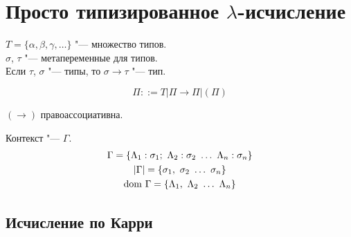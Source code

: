 \section{Просто типизированное $\lambda$-исчисление}

\begin{definition}[Тип]
    $T = \{\alpha, \beta, \gamma, \ldots\}$ "--- множество типов. \\
    $\sigma$, $\tau$ "--- метапеременные для типов. \\
    Если $\tau$, $\sigma$ "--- типы, то $\sigma \rightarrow \tau$ "--- тип. \\
    \begin{bnf}
    \[
        \Pi ::= T | \Pi \rightarrow \Pi | (\Pi)
    \]
    \end{bnf}
    $\left(\rightarrow\right)$ правоассоциативна.
\end{definition}

\begin{definition}[Контекст] Контекст "--- $\Gamma$.
\begin{gather*}
    \Gamma = \{ \Lambda_{1} : \sigma_{1};\ \Lambda_{2} : \sigma_{2}\ \ldots\ \Lambda_{n} : \sigma_{n} \} \\
    \abs{\Gamma} = \{ \sigma_{1},\ \sigma_{2}\ \ldots\ \sigma_{n} \} \\
    \mathrm{dom}\ \Gamma = \{ \Lambda_{1},\ \Lambda_{2}\ \ldots\ \Lambda_{n} \}
\end{gather*}
\end{definition}

\subsection{Исчисление по Карри}

